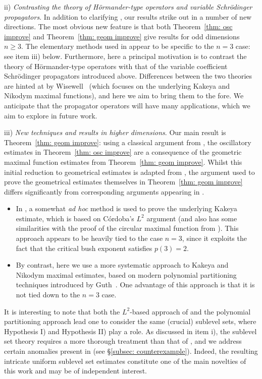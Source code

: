 \documentclass[reqno]{amsart}
\numberwithin{equation}{section}
\theoremstyle{plain}
\theoremstyle{definition}
\begin{document}
\noindent ii) \textit{Contrasting the theory of H\"ormander-type operators and variable Schr\"odinger propagators}. In addition to clarifying \cite{Bourgain1991}, our results strike out in a number of new directions. The most obvious new feature is that both Theorem~\ref{thm: osc improve} and Theorem~\ref{thm: geom improve} give results for odd dimensions $n \geq 3$. The elementary methods used in \cite{Bourgain1991} appear to be specific to the $n=3$ case: see item iii) below. Furthermore, here a principal motivation is to contrast the theory of H\"ormander-type operators with that of the variable coefficient Schr\"odinger propagators introduced above. Differences between the two theories are hinted at by Wisewell~\cite{Wisewell2005} (which focuses on the underlying Kakeya and Nikodym maximal functions), and here we aim to bring them to the fore. We anticipate that the propagator operators will have many applications, which we aim to explore in future work.\medskip

\noindent iii) \textit{New techniques and results in higher dimensions}. Our main result is Theorem~\ref{thm: geom improve}: using a classical argument from \cite{Bourgain1991}, the oscillatory estimates in Theorem~\ref{thm: osc improve} are a consequence of the geometric maximal function estimates from Theorem~\ref{thm: geom improve}. Whilst this initial reduction to geometrical estimates is adapted from \cite{Bourgain1991}, the argument used to prove the geometrical estimates themselves in Theorem~\ref{thm: geom improve} differs significantly from corresponding arguments appearing in \cite{Bourgain1991}.
\begin{itemize}
    \item In \cite{Bourgain1991}, a somewhat \textit{ad hoc} method is used to prove the underlying Kakeya estimate, which is based on C\'ordoba's $L^2$ argument \cite{Cordoba1977} (and also has some similarities with the proof of the circular maximal function from \cite{Bourgain1986}). This approach appears to be heavily tied to the case $n = 3$, since it exploits the fact that the critical bush exponent satisfies $p(3) = 2$. 
    \item By contrast, here we use a more systematic approach to Kakeya and Nikodym maximal estimates, based on modern polynomial partitioning techniques introduced by Guth~\cite{Guth2016}. One advantage of this approach is that it is not tied down to the $n=3$ case.
\end{itemize}
It is interesting to note that both  the $L^2$-based approach of \cite{Bourgain1991} and the polynomial partitioning approach lead one to consider the same (crucial) sublevel sets, where Hypothesis I) and Hypothesis II) play a role. As discussed in item i), the sublevel set theory requires a more thorough treatment than that of \cite{Bourgain1991}, and we address certain anomalies present in \cite{Bourgain1991} (see \S\ref{subsec: counterexample}). Indeed, the resulting intricate uniform sublevel set estimates constitute one of the main novelties of this work and may be of independent interest.  
\end{document}
